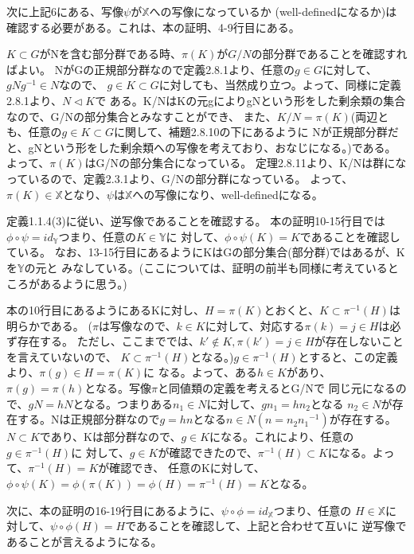 \documentclass{jsarticle}
\begin{document}
次に上記6にある、写像$\psi$が$\mathbb{X}$への写像になっているか
(well-definedになるか)は確認する必要がある。これは、本の証明、4-9行目にある。

$K \subset G$がNを含む部分群である時、$\pi(K)$が$G/N$の部分群であることを確認すればよい。
NがGの正規部分群なので定義2.8.1より、任意の$g \in G$に対して、$gNg^{-1} \in N$なので、
$g \in K \subset G$に対しても、当然成り立つ。よって、同様に定義2.8.1より、$N \triangleleft K$で
ある。K/NはKの元gによりgNという形をした剰余類の集合なので、G/Nの部分集合とみなすことができ、
また、$K/N = \pi(K)$(両辺とも、任意の$g \in K \subset G$に関して、補題2.8.10の下にあるように
Nが正規部分群だと、gNという形をした剰余類への写像を考えており、おなじになる。)である。
よって、$\pi(K)$はG/Nの部分集合になっている。
定理2.8.11より、K/Nは群になっているので、定義2.3.1より、G/Nの部分群になっている。
よって、$\pi(K) \in \mathbb{X}$となり、$\psi$は$\mathbb{X}$への写像になり、well-definedになる。

定義1.1.4(3)に従い、逆写像であることを確認する。
本の証明10-15行目では$\phi \circ \psi = id_{\mathbb{Y}}$つまり、任意の$K \in \mathbb{Y}$に
対して、$\phi \circ \psi(K) = K$であることを確認している。
なお、13-15行目にあるようにKはGの部分集合(部分群)ではあるが、Kを$\mathbb{Y}$の元と
みなしている。(ここについては、証明の前半も同様に考えているところがあるように思う。)

本の10行目にあるようにあるKに対し、$H = \pi(K) $とおくと、$K \subset \pi^{-1}(H)$は明らかである。
($\pi$は写像なので、$k \in K$に対して、対応する$\pi(k) = j \in H$は必ず存在する。
ただし、ここまででは、$k' \notin K, \pi(k') = j \in H$が存在しないことを言えていないので、
$K \subset \pi^{-1}(H)$となる。)$g \in \pi^{-1}(H)$とすると、この定義より、$\pi(g) \in H = \pi(K)$に
なる。よって、ある$h \in K$があり、$\pi(g) = \pi(h)$となる。写像$\pi$と同値類の定義を考えるとG/Nで
同じ元になるので、$gN = hN$となる。つまりある$n_1 \in N$に対して、$g n_1 = h n_2$となる
$n_2 \in N$が存在する。Nは正規部分群なので$g = h n$となる$n \in N(n = n_2 {n_1}^{-1})$が存在する。
$N \subset K$であり、Kは部分群なので、$g \in K$になる。これにより、任意の$g \in \pi^{-1}(H)$に
対して、$g \in K$が確認できたので、$\pi^{-1}(H) \subset K$になる。よって、$\pi^{-1}(H) = K$が確認でき、
任意のKに対して、$\phi \circ \psi(K) = \phi(\pi(K)) = \phi(H) = \pi^{-1}(H) = K$となる。

次に、本の証明の16-19行目にあるように、$\psi \circ \phi = id_{\mathbb{X}}$つまり、任意の
$H \in \mathbb{X}$に対して、$\psi \circ \phi(H) = H$であることを確認して、上記と合わせて互いに
逆写像であることが言えるようになる。
\end{document}
